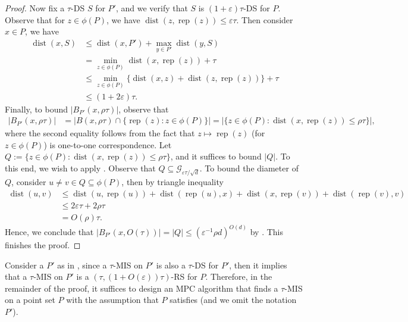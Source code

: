 \documentclass[11pt,letterpaper]{article}
\theoremstyle{plain}
\theoremstyle{definition}
\theoremstyle{remark}
\DeclareMathOperator{\dist}{dist}
\DeclareMathOperator*{\rep}{rep}
\renewcommand{\epsilon}{\ensuremath{\varepsilon}}
\let\epsilon\varepsilon
\begin{document}
\begin{proof}
        Now fix a $\tau$-DS $S$ for $P'$, and we verify that $S$ is $(1 + \epsilon)\tau$-DS for $P$.
        Observe that for $z \in \phi(P)$, we have $\dist(z, \rep(z)) \leq \epsilon \tau$.
        Then consider $x \in P$, we have
        \begin{align*}
            \dist(x, S)
            &\leq \dist(x, P') + \max_{y \in P'} \dist(y, S) \\
            &= \min_{z \in \phi(P)} \dist(x, \rep(z)) + \tau \\
            &\leq \min_{z \in \phi(P)} \{ \dist(x, z) + \dist(z, \rep(z)) \} + \tau \\
            &\leq (1 + 2\epsilon) \tau.
        \end{align*}
        Finally, to bound $|B_{P'}(x, \rho\tau)|$, observe that
        \begin{align*}
            |B_{P'} (x, \rho \tau)|
            &= |B(x, \rho \tau) \cap \{ \rep(z) : z \in \phi(P) \}| = | \{ z \in \phi(P) : \dist(x, \rep(z)) \leq \rho\tau \} |,
        \end{align*}
        where the second equality follows from the fact that $z \mapsto \rep(z)$ (for $z \in \phi(P)$) is one-to-one correspondence.
        Let $Q :=  \{ z \in \phi(P) : \dist(x, \rep(z)) \leq \rho\tau \} $, and it suffices to bound $|Q|$.
        To this end, we wish to apply .
        Observe that $Q \subseteq \mathcal{G}_{\epsilon \tau / \sqrt d}$.
        To bound the diameter of $Q$, consider $u \neq v \in Q \subseteq \phi(P)$, then by triangle inequality
        \begin{align*}
            \dist(u, v)
            &\leq \dist(u, \rep(u)) + \dist(\rep(u), x) + \dist(x, \rep(v)) + \dist(\rep(v), v) \\
            &\leq 2\epsilon \tau +  2\rho \tau\\
            &= O(\rho)\tau.
        \end{align*}
        Hence, we conclude that $|B_{P'}(x, O(\tau))| = |Q| \leq (\epsilon^{-1} \rho d)^{O(d)}$ by .
        This finishes the proof.
    \end{proof}

Consider a $P'$ as in ,
since a $\tau$-MIS on $P'$ is also a $\tau$-DS for $P'$,
then it implies that a $\tau$-MIS on $P'$ is a $(\tau, (1 + O(\epsilon))\tau)$-RS for $P$.
Therefore,  in the remainder of the proof,
it suffices to design an MPC algorithm that finds a $\tau$-MIS on a point set $P$ with the assumption that $P$ satisfies  (and we omit the notation $P'$).
\end{document}

